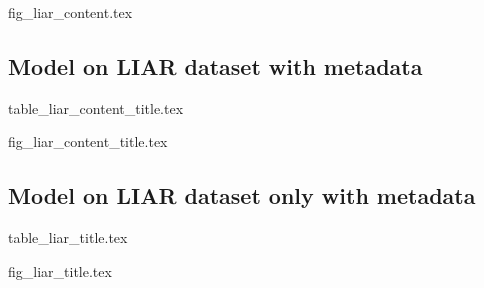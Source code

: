 \documentclass{article}
\begin{document}
\newpage

{fig_liar_content.tex}


\newpage


\begin{landscape}
    \subsection*{Model on LIAR dataset with metadata}
    \begin{adjustbox}{scale = 0.75}
        \centering      
        {table_liar_content_title.tex}
    \end{adjustbox}
\end{landscape}

\newpage

{fig_liar_content_title.tex}


\newpage
\begin{landscape}
\subsection*{Model on LIAR dataset only with metadata}
\begin{adjustbox}{scale = 0.75}
    \centering      
    {table_liar_title.tex}
\end{adjustbox}
\end{landscape}

\newpage

{fig_liar_title.tex}
\end{document}
